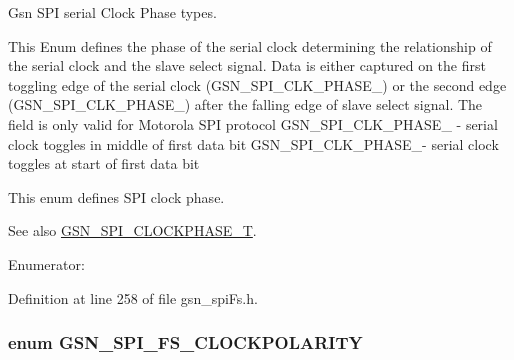 Gsn SPI serial Clock Phase types. 

This Enum defines the phase of the serial clock determining the relationship of the serial clock and the slave select signal. Data is either captured on the first toggling edge of the serial clock (GSN\_\-SPI\_\-CLK\_\-PHASE\_) or the second edge (GSN\_\-SPI\_\-CLK\_\-PHASE\_) after the falling edge of slave select signal. The field is only valid for Motorola SPI protocol GSN\_\-SPI\_\-CLK\_\-PHASE\_ -\/ serial clock toggles in middle of first data bit GSN\_\-SPI\_\-CLK\_\-PHASE\_-\/ serial clock toggles at start of first data bit

This enum defines SPI clock phase. \begin{DoxySeeAlso}{See also}
\hyperlink{a00655_ga1399b803d30956e8ed6f4929033329ad}{GSN\_\-SPI\_\-CLOCKPHASE\_\-T}. 
\end{DoxySeeAlso}
\begin{Desc}
\item[Enumerator: ]\par
\begin{description}
\item[{\em 
\hypertarget{a00655_ggae764e5eefaf1dedaf1561a7cd3ccb6aaae053afe0021f0be80f2318093df597fd}{
GSN\_\-SPI\_\-FS\_\-CLK\_\-PHASE\_\-0}
\label{a00655_ggae764e5eefaf1dedaf1561a7cd3ccb6aaae053afe0021f0be80f2318093df597fd}
}]\item[{\em 
\hypertarget{a00655_ggae764e5eefaf1dedaf1561a7cd3ccb6aaa30f2e6a4ca4727ce627063d9d1d28c5a}{
GSN\_\-SPI\_\-FS\_\-CLK\_\-PHASE\_\-180}
\label{a00655_ggae764e5eefaf1dedaf1561a7cd3ccb6aaa30f2e6a4ca4727ce627063d9d1d28c5a}
}]\end{description}
\end{Desc}



Definition at line 258 of file gsn\_\-spiFs.h.

\hypertarget{a00655_ga5d0a21479bf57ff38c1c967f95ea5e83}{
\subsubsection[{GSN\_\-SPI\_\-FS\_\-CLOCKPOLARITY}]{\setlength{\rightskip}{0pt plus 5cm}enum {\bf GSN\_\-SPI\_\-FS\_\-CLOCKPOLARITY}}}
\label{a00655_ga5d0a21479bf57ff38c1c967f95ea5e83}


